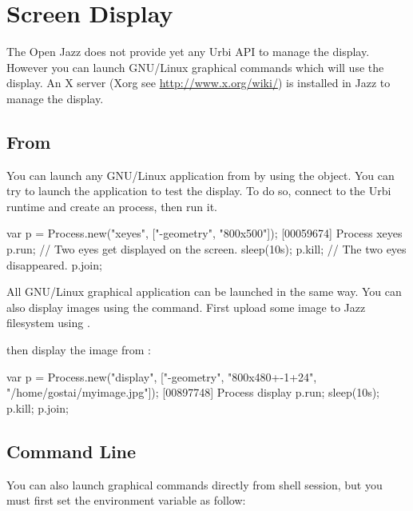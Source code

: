 \section{Screen Display}

The Open Jazz does not provide yet any Urbi API to manage the
display. However you can launch GNU/Linux graphical commands which will use
the display.  An X server (Xorg see \url{http://www.x.org/wiki/}) is
installed in Jazz to manage the display.

\subsection{From \us}

You can launch any GNU/Linux application from \us by using the
 object. You can try to launch the 
application to test the display. To do so, connect to the Urbi runtime and
create an  process, then run it.

\begin{urbiunchecked}
var p = Process.new("xeyes", ["-geometry", "800x500"]);
[00059674] Process xeyes
p.run;
// Two eyes get displayed on the screen.
sleep(10s);
p.kill;
// The two eyes disappeared.
p.join;
\end{urbiunchecked}%

All GNU/Linux graphical application can be launched in the same way.  You
can also display images using the  command. First upload
some image to Jazz filesystem using .


\noindent
then display the image from \us:

\begin{urbiunchecked}
var p = Process.new("display",
                    ["-geometry", "800x480+-1+24", "/home/gostai/myimage.jpg"]);
[00897748] Process display
p.run;
sleep(10s);
p.kill;
p.join;
\end{urbiunchecked}

\subsection{Command Line}

You can also launch graphical commands directly from shell session, but you
must first set the  environment variable as follow:

